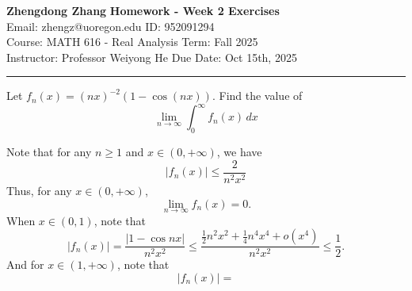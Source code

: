 \documentclass[letterpaper, 12pt]{article}
\begin{document}
\noindent
\large\textbf{Zhengdong Zhang} \hfill \textbf{Homework - Week 2 Exercises}   \\
Email: zhengz@uoregon.edu \hfill ID: 952091294 \\
\normalsize Course: MATH 616 - Real Analysis \hfill Term: Fall 2025 \\
Instructor: Professor Weiyong He \hfill Due Date: Oct 15th, 2025 \\
\noindent\rule{7in}{2.8pt}
\begin{problem}{1.0}
Let \(f_n(x)=(nx)^{-2}(1-\cos(nx))\). Find the value of 
\[\lim_{n\to \infty}\int_{0}^{\infty} f_n(x)  \,dx \]
\end{problem}
\begin{solution}
Note that for any \(n\geq 1\) and \(x\in (0,+\infty)\), we have 
\[|f_n(x)|\leq \frac{2}{n^2x^2}\]
Thus, for any \(x\in (0,+\infty)\), 
\[\lim_{n\to \infty}f_n(x)=0.\]
When \(x\in (0,1)\), note that 
\[|f_n(x)|=\frac{|1-\cos nx|}{n^2x^2}\leq \frac{\frac{1}{2}n^2x^2+\frac{1}{4}n^4x^4+o(x^4)}{n^2x^2}\leq \frac{1}{2}.\]
And for \(x\in (1,+\infty)\), note that 
\[|f_n(x)|=\]
\end{solution}
\end{document}
